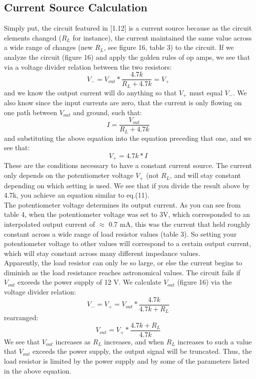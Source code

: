 \documentclass{article}
\begin{document}
\subsection{Current Source Calculation}
    Simply put, the circuit featured in [1.12] is a current source because as the circuit elements changed ($R_L$ for instance), the current maintained the same value across a wide range of changes (new $R_L$, see figure 16, table 3) to the circuit. If we analyze the circuit (figure 16) and apply the golden rules of op amps, we see that via a voltage divider relation between the two resistors:
    \begin{equation}
        V_- = V_{out} * \frac{4.7k}{R_L + 4.7k} = V_+
    \end{equation}
    and we know the output current will do anything so that $V_+$ must equal $V_-$. We also know since the input currents are zero, that the current is only flowing on one path between $V_{out}$ and ground, such that:
    \begin{equation}
        I = \frac{V_{out}}{R_L + 4.7k}
    \end{equation}
    and substituting the above equation into the equation preceding that one, and we see that:
    \begin{equation}
        V_+ = 4.7k * I
    \end{equation}
    These are the conditions necessary to have a constant current source. The current only depends on the potentiometer voltage $V_+$ (not $R_L$, and will stay constant depending on which setting is used. We see that if you divide the result above by 4.7k, you achieve an equation similar to eq.(11).
    \\\indent The potentiometer voltage determines its output current. As you can see from table 4, when the potentiometer voltage was set to 3V, which corresponded to an interpolated output current of $\approx$ 0.7 mA, this was the current that held roughly constant across a wide range of load resistor values (table 3). So setting your potentiometer voltage to other values will correspond to a certain output current, which will stay constant across many different impedance values.
    \\\indent Apparently, the load resistor can only be so large, or else the current begins to diminish as the load resistance reaches astronomical values. The circuit fails if $V_{out}$ exceeds the power supply of 12 V. We calculate $V_{out}$ (figure 16) via the voltage divider relation:
    \begin{equation}
        V_- = V_+ = V_{out} * \frac{4.7k}{4.7k + R_L}
    \end{equation}
    rearranged:
    \begin{equation}
        V_{out} = V_+ * \frac{4.7k + R_L}{4.7k}
    \end{equation}
    We see that $V_{out}$ increases as $R_L$ increases, and when $R_L$ increases to such a value that $V_{out}$ exceeds the power supply, the output signal will be truncated. Thus, the load resistor is limited by the power supply and by some of the parameters listed in the above equation.
\end{document}
